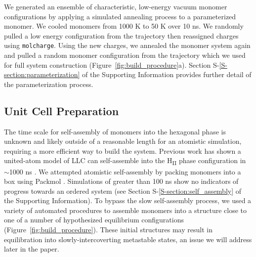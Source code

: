\documentclass[journal=jpcbfk,manuscript=article]{achemso}
\begin{document}
  We generated an ensemble of characteristic, low-energy vacuum monomer
  configurations by applying a simulated annealing process to a
  parameterized monomer. We cooled monomers from 1000 K to 50 K over 10
  ns. We randomly pulled a low energy configuration from the
  trajectory then reassigned charges using \texttt{molcharge}. Using the new
  charges, we annealed the monomer system again and pulled a random monomer
  configuration from the trajectory which we used for full system
  construction (Figure~\ref{fig:build_procedure}a). Section S-\ref{S-section:parameterization} 
  of the Supporting Information provides further detail of the parameterization process.

  \subsection{Unit Cell Preparation}

  The time scale for self-assembly of monomers into the hexagonal phase is
  unknown and likely outside of a reasonable length for an atomistic simulation,
  requiring a more efficient way to build the system. Previous work has shown
  a united-atom model of LLC can self-assemble into the H\textsubscript{II} phase
  configuration in $\sim$1000 ns \cite{mondal_self-assembly_2013}.  We
  attempted atomistic self-assembly by packing monomers into a box using Packmol
  \cite{martinez_packmol:_2009}. Simulations of greater than 100 ns show no
  indicators of progress towards an ordered system (see Section S-\ref{S-section:self_assembly} of the 
  Supporting Information). 
  To bypass the slow self-assembly process, we used a variety of automated procedures 
  to assemble monomers
  into a structure close to one of a number of hypothesized equilibrium configurations
  (Figure~\ref{fig:build_procedure}).
  These initial structures may result in equilibration into slowly-intercoverting
  metastable states, an issue we will address later in the paper. 
  
\end{document}

